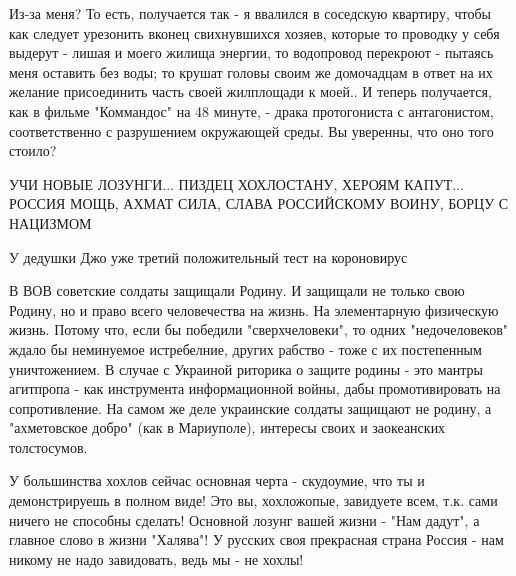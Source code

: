 Из-за меня? То есть, получается так - я ввалился в соседскую квартиру, чтобы как следует урезонить вконец свихнувшихся хозяев, которые то проводку у себя выдерут - лишая и моего жилища энергии, то водопровод перекроют - пытаясь меня оставить без воды; то крушат головы своим же домочадцам в ответ на их желание присоединить часть своей жилплощади к моей..
И теперь получается, как в фильме "Коммандос" на 48 минуте,  - драка протогониста с антагонистом, соответственно с разрушением окружающей среды.
Вы уверенны, что оно того стоило?

УЧИ НОВЫЕ ЛОЗУНГИ... ПИЗДЕЦ ХОХЛОСТАНУ, ХЕРОЯМ КАПУТ... РОССИЯ МОЩЬ, АХМАТ
СИЛА, СЛАВА РОССИЙСКОМУ ВОИНУ, БОРЦУ С НАЦИЗМОМ

У дедушки Джо уже третий положительный тест на короновирус

В ВОВ советские солдаты защищали Родину.
И защищали не только свою Родину, но и право всего человечества на жизнь. На элементарную физическую жизнь. Потому что, если бы победили "сверхчеловеки", то одних "недочеловеков" ждало бы неминуемое истребелние, других рабство - тоже с их постепенным уничтожением.
В случае с Украиной риторика о защите родины - это мантры агитпропа - как инструмента информационной войны, дабы промотивировать на сопротивление. На самом же деле украинские солдаты защищают не родину, а "ахметовское добро" (как в Мариуполе), интересы своих и заокеанских толстосумов.

У большинства хохлов сейчас основная черта - скудоумие, что ты и демонстрируешь
в полном виде! Это вы, хохложопые, завидуете всем, т.к. сами ничего не способны
сделать! Основной лозунг вашей жизни - "Нам дадут", а главное слово в жизни
"Халява"! У русских своя прекрасная страна Россия - нам никому не надо
завидовать, ведь мы - не хохлы!

